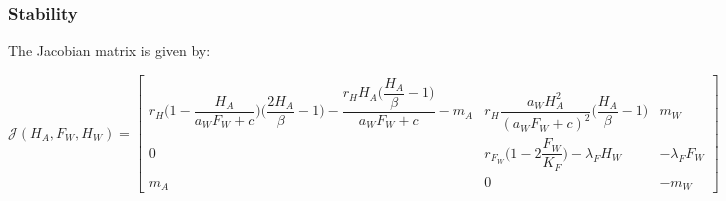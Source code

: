 \documentclass{article}
\newcommand{\lfw}{\lambda_{F}}
\begin{document}
\subsubsection{Stability}
The Jacobian matrix is given by:

\begin{equation}
\mathcal{J}(H_A, F_W, H_W) = \begin{bmatrix}
r_H\Big(1-\dfrac{H_A}{a_WF_W+c}\Big)\Big(\dfrac{2H_A}{\beta}-1\Big) - \dfrac{r_H H_A\Big(\dfrac{H_A}{\beta}-1\Big)}{a_WF_W+c} - m_A & r_H \dfrac{a_WH_A^2}{(a_WF_W+c)^2} \Big(\dfrac{H_A}{\beta}-1\Big) & m_W \\
0 & r_{F_W} \Big(1-2\dfrac{F_W}{K_F}\Big) - \lfw H_W & - \lfw F_W \\
m_A & 0 & -m_W
\end{bmatrix}
\end{equation}
\end{document}
